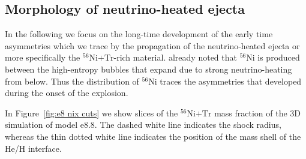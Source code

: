 \documentclass[fleqn,usenatbib]{mnras}
\newcommand{\nickel}{\ensuremath{\mathrm{^{56}Ni}}\xspace}
\newcommand{\tracer}{\ensuremath{\mathrm{Tr}}\xspace}
\newcommand{\onemg}{\ensuremath{\mathrm{e8.8}}\xspace}
\begin{document}
\subsection{Morphology of neutrino-heated ejecta}
In the following we focus on the long-time development of the early time asymmetries which we trace by the propagation of the neutrino-heated ejecta or more specifically the $\nickel\mathord{+}\tracer$-rich material. \cite{Kifonidis2003} already noted that \nickel is produced between the high-entropy bubbles that expand due to strong neutrino-heating from below. Thus the distribution of \nickel traces the asymmetries that developed during the onset of the explosion. 

In Figure~\ref{fig:e8 nix cuts} we show slices of the $\nickel\mathord{+}\tracer$ mass fraction of the 3D simulation of model \onemg. The dashed white line indicates the shock radius, whereas the thin dotted white line indicates the position of the mass shell of the He/H interface.
\end{document}
